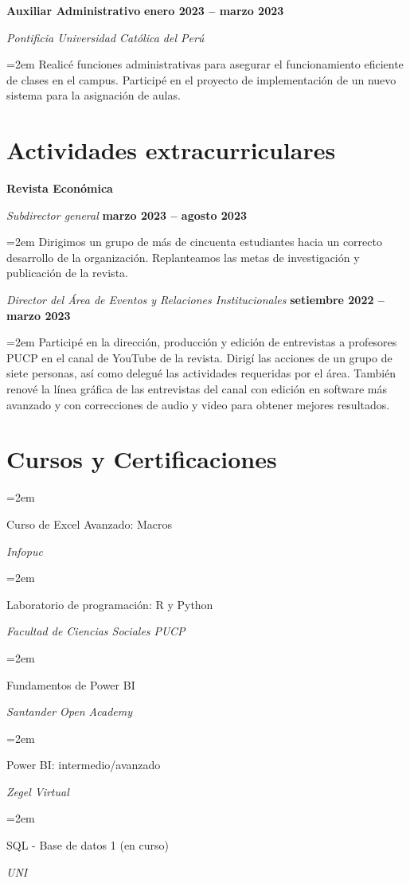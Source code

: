 \documentclass[11pt]{article}
\newlength{\spacebox}
\newcommand{\sepspace}{\vspace*{0.5em}}
\newcommand{\work}[4]{
  \noindent  \textbf{#1}
  \hfill {\textbf{#2}} \par
  \noindent \textit{#3} \par
  \vspace*{0.5em}
  \noindent\hangindent=2em\hangafter=0 \small #4 
\normalsize \par}
\newcommand{\volunt}[7]{
\noindent \textbf{#1} \par

\noindent \textit{#2}
\hfill {\textbf{#3}} \par
\vspace*{0.5em}
  \noindent\hangindent=2em\hangafter=0 \small #4 
  \sepspace

\noindent \textit{#5}
\hfill {\textbf{#6}} \par
\vspace*{0.5em}
  \noindent\hangindent=2em\hangafter=0 \small #7 

\normalsize \par}
\newcommand{\lan}[2]{
    \noindent\hangindent=2em\hangafter=0
    \parbox{6\spacebox}{%
        {#1}} %
     \textsl{#2} \par}    %
\begin{document}
\sepspace

\work{Auxiliar Administrativo}{enero 2023 – marzo 2023}{Pontificia Universidad Cat\'olica  del Per\'u}{Realic\'e funciones administrativas para asegurar el funcionamiento eficiente de clases en el campus. Particip\'e en el proyecto
de implementaci\'on de un nuevo sistema para la asignaci\'on de aulas.}

\section*{Actividades extracurriculares}

\volunt{Revista Econ\'omica}{Subdirector general}{marzo 2023 – agosto 2023}{Dirigimos un grupo de m\'as de cincuenta estudiantes hacia un correcto desarrollo de la organizaci\'on. Replanteamos las metas de investigaci\'on y publicaci\'on de la revista.}{Director del \'Area de Eventos y Relaciones Institucionales}{setiembre 2022 – marzo 2023}{Particip\'e en la direcci\'on, producci\'on y edici\'on de entrevistas a profesores PUCP en el canal de YouTube de la revista. Dirig\'i las acciones de un grupo de siete personas, as\'i como delegu\'e las actividades requeridas por el \'area. Tambi\'en renov\'e la l\'inea gr\'afica de las entrevistas del canal con edici\'on en software m\'as avanzado y con correcciones de audio y video para obtener mejores resultados.}


\section*{Cursos y Certificaciones}
\lan{Curso de Excel Avanzado: Macros}{Infopuc}
\lan{Laboratorio de programaci\'on: R y Python}{Facultad de Ciencias Sociales PUCP}
\lan{Fundamentos de Power BI}{Santander Open Academy}
\lan{Power BI: intermedio/avanzado}{Zegel Virtual}
\lan{SQL - Base de datos 1 (en curso)}{UNI}
\end{document}
